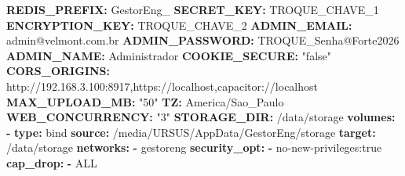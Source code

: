 \documentclass[
  10pt,
]{article}
\newenvironment{Shaded}{\begin{snugshade}}{\end{snugshade}}
\newcommand{\AttributeTok}[1]{\textcolor[rgb]{0.13,0.29,0.53}{#1}}
\newcommand{\FunctionTok}[1]{\textcolor[rgb]{0.13,0.29,0.53}{\textbf{#1}}}
\newcommand{\KeywordTok}[1]{\textcolor[rgb]{0.13,0.29,0.53}{\textbf{#1}}}
\newcommand{\StringTok}[1]{\textcolor[rgb]{0.31,0.60,0.02}{#1}}
\begin{document}
\begin{Shaded}
\begin{Highlighting}[]
\AttributeTok{      }\FunctionTok{REDIS\_PREFIX}\KeywordTok{:}\AttributeTok{ GestorEng\_}
\AttributeTok{      }\FunctionTok{SECRET\_KEY}\KeywordTok{:}\AttributeTok{ TROQUE\_CHAVE\_1}
\AttributeTok{      }\FunctionTok{ENCRYPTION\_KEY}\KeywordTok{:}\AttributeTok{ TROQUE\_CHAVE\_2}
\AttributeTok{      }\FunctionTok{ADMIN\_EMAIL}\KeywordTok{:}\AttributeTok{ admin@velmont.com.br}
\AttributeTok{      }\FunctionTok{ADMIN\_PASSWORD}\KeywordTok{:}\AttributeTok{ TROQUE\_Senha@Forte2026}
\AttributeTok{      }\FunctionTok{ADMIN\_NAME}\KeywordTok{:}\AttributeTok{ Administrador}
\AttributeTok{      }\FunctionTok{COOKIE\_SECURE}\KeywordTok{:}\AttributeTok{ }\StringTok{"false"}
\AttributeTok{      }\FunctionTok{CORS\_ORIGINS}\KeywordTok{:}\AttributeTok{ http://192.168.3.100:8917,https://localhost,capacitor://localhost}
\AttributeTok{      }\FunctionTok{MAX\_UPLOAD\_MB}\KeywordTok{:}\AttributeTok{ }\StringTok{"50"}
\AttributeTok{      }\FunctionTok{TZ}\KeywordTok{:}\AttributeTok{ America/Sao\_Paulo}
\AttributeTok{      }\FunctionTok{WEB\_CONCURRENCY}\KeywordTok{:}\AttributeTok{ }\StringTok{"3"}
\AttributeTok{      }\FunctionTok{STORAGE\_DIR}\KeywordTok{:}\AttributeTok{ /data/storage}
\AttributeTok{    }\FunctionTok{volumes}\KeywordTok{:}
\AttributeTok{      }\KeywordTok{{-}}\AttributeTok{ }\FunctionTok{type}\KeywordTok{:}\AttributeTok{ bind}
\AttributeTok{        }\FunctionTok{source}\KeywordTok{:}\AttributeTok{ /media/URSUS/AppData/GestorEng/storage}
\AttributeTok{        }\FunctionTok{target}\KeywordTok{:}\AttributeTok{ /data/storage}
\AttributeTok{    }\FunctionTok{networks}\KeywordTok{:}
\AttributeTok{      }\KeywordTok{{-}}\AttributeTok{ gestoreng}
\AttributeTok{    }\FunctionTok{security\_opt}\KeywordTok{:}
\AttributeTok{      }\KeywordTok{{-}}\AttributeTok{ no{-}new{-}privileges:true}
\AttributeTok{    }\FunctionTok{cap\_drop}\KeywordTok{:}
\AttributeTok{      }\KeywordTok{{-}}\AttributeTok{ ALL}


\end{Highlighting}
\end{Shaded}
\end{document}
